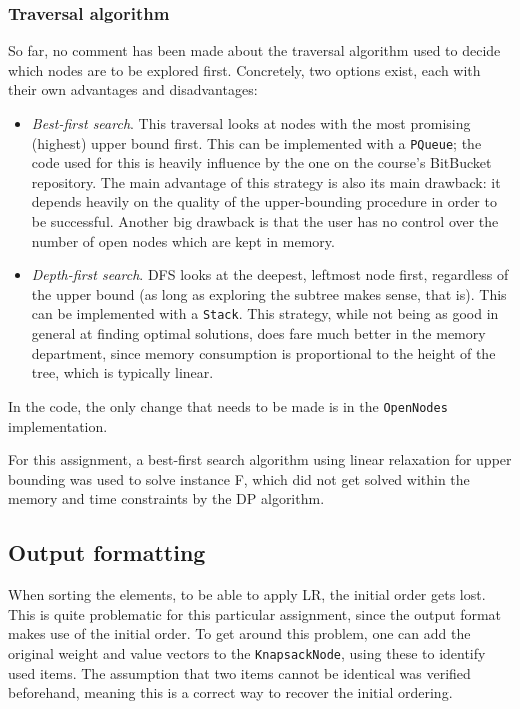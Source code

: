 \documentclass[journal]{IEEEtran}
\newcommand{\scala}[1]{\texttt{#1}}
\begin{document}
\subsubsection{Traversal algorithm}
So far, no comment has been made about the traversal algorithm used to decide which nodes are to be explored first.
Concretely, two options exist, each with their own advantages and disadvantages:
\begin{itemize}
	\item \emph{Best-first search}.
	This traversal looks at nodes with the most promising (highest) upper bound first.
	This can be implemented with a \scala{PQueue}; the code used for this is heavily influence by the one on the course's BitBucket repository.
	The main advantage of this strategy is also its main drawback: it depends heavily on the quality of the upper-bounding procedure in order to be successful.
	Another big drawback is that the user has no control over the number of open nodes which are kept in memory.
	\item \emph{Depth-first search}.
	DFS looks at the deepest, leftmost node first, regardless of the upper bound (as long as exploring the subtree makes sense, that is).
	This can be implemented with a \scala{Stack}.
	This strategy, while not being as good in general at finding optimal solutions, does fare much better in the memory department, since memory consumption is proportional to the height of the tree, which is typically linear.
\end{itemize}
In the code, the only change that needs to be made is in the \scala{OpenNodes} implementation.

For this assignment, a best-first search algorithm using linear relaxation for upper bounding was used to solve instance F, which did not get solved within the memory and time constraints by the DP algorithm.

\subsection{Output formatting}
\label{sec:bnboutput}
When sorting the elements, to be able to apply LR, the initial order gets lost.
This is quite problematic for this particular assignment, since the output format makes use of the initial order.
To get around this problem, one can add the original weight and value vectors to the \scala{KnapsackNode}, using these to identify used items.
The assumption that two items cannot be identical was verified beforehand, meaning this is a correct way to recover the initial ordering.
\end{document}
